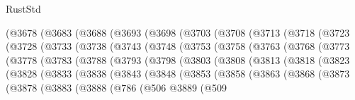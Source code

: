 \begin{lexlean}{RustStd}
\begin{coremodule}
{\begin{coremodule}
{{{{{{{{{{{{{{{{{{{{{{{{{{{{{{{{{{{{{{{{{{{{{{{{{{{{{{{    (@3678
      (@3683
        (@3688
          (@3693
            (@3698
              (@3703
                (@3708
                  (@3713
                    (@3718
                      (@3723
                        (@3728
                          (@3733
                            (@3738
                              (@3743
                                (@3748
                                  (@3753
                                    (@3758
                                      (@3763
                                        (@3768
                                          (@3773
                                            (@3778
                                              (@3783
                                                (@3788
                                                  (@3793
                                                    (@3798
                                                      (@3803
                                                        (@3808
                                                          (@3813
                                                            (@3818
                                                              (@3823
                                                                (@3828
                                                                  (@3833
                                                                    (@3838
                                                                      (@3843
                                                                        (@3848
                                                                          (@3853
                                                                            (@3858
                                                                              (@3863
                                                                                (@3868
                                                                                  (@3873
                                                                                    (@3878
                                                                                      (@3883
                                                                                        (@3888
                                                                                          (@786
                                                                                            (@506
                                                                                              @3889
                                                                                              (@509
}}}}}}}}}}}}}}}}}}}}}}}}}}}}}}}}}}}}}}}}}}}}}}}}}}}}}}}
\end{coremodule}}
\end{coremodule}
\end{lexlean}

